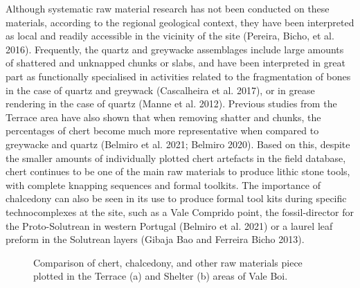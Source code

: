 \documentclass[
  a4paper,
  DIV=11,
  numbers=noendperiod]{scrreprt}
\begin{document}
Although systematic raw material research has not been conducted on
these materials, according to the regional geological context, they have
been interpreted as local and readily accessible in the vicinity of the
site (Pereira, Bicho, et al. 2016). Frequently, the quartz and greywacke
assemblages include large amounts of shattered and unknapped chunks or
slabs, and have been interpreted in great part as functionally
specialised in activities related to the fragmentation of bones in the
case of quartz and greywack (Cascalheira et al. 2017), or in grease
rendering in the case of quartz (Manne et al. 2012). Previous studies
from the Terrace area have also shown that when removing shatter and
chunks, the percentages of chert become much more representative when
compared to greywacke and quartz (Belmiro et al. 2021; Belmiro 2020).
Based on this, despite the smaller amounts of individually plotted chert
artefacts in the field database, chert continues to be one of the main
raw materials to produce lithic stone tools, with complete knapping
sequences and formal toolkits. The importance of chalcedony can also be
seen in its use to produce formal tool kits during specific
technocomplexes at the site, such as a Vale Comprido point, the
fossil-director for the Proto-Solutrean in western Portugal (Belmiro et
al. 2021) or a laurel leaf preform in the Solutrean layers (Gibaja Bao
and Ferreira Bicho 2013).

\begin{figure}


\caption{\label{fig-rm-comparison}Comparison of chert, chalcedony, and
other raw materials piece plotted in the Terrace (a) and Shelter (b)
areas of Vale Boi.}

\end{figure}%
\end{document}
